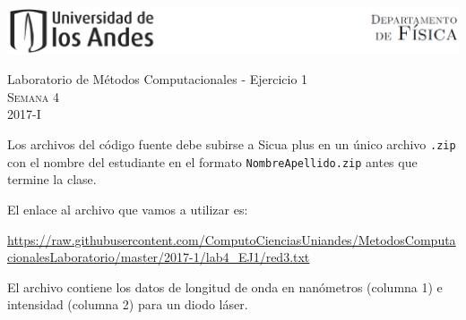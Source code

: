 \documentclass[11pt,letterpaper]{exam}
\begin{document}
\begin{center}

\includegraphics[width=16cm]{header.png}

\vspace{1.0cm}
{\Large Laboratorio de M\'etodos Computacionales - Ejercicio 1} \\
\textsc{Semana 4}\\
2017-I\\
\end{center}



\vspace{0.5cm}

\noindent
Los archivos del c\'odigo fuente debe subirse a Sicua plus en un \'unico archivo \verb'.zip' con el nombre del estudiante en el formato \verb"NombreApellido.zip" antes que termine la clase.

El enlace al archivo que vamos a utilizar es:

\url{https://raw.githubusercontent.com/ComputoCienciasUniandes/MetodosComputacionalesLaboratorio/master/2017-1/lab4_EJ1/red3.txt}

El archivo contiene los datos de longitud de onda en nan\'ometros (columna 1) e intensidad (columna 2) para un diodo l\'aser.

\vspace{0.5cm}
\end{document}
